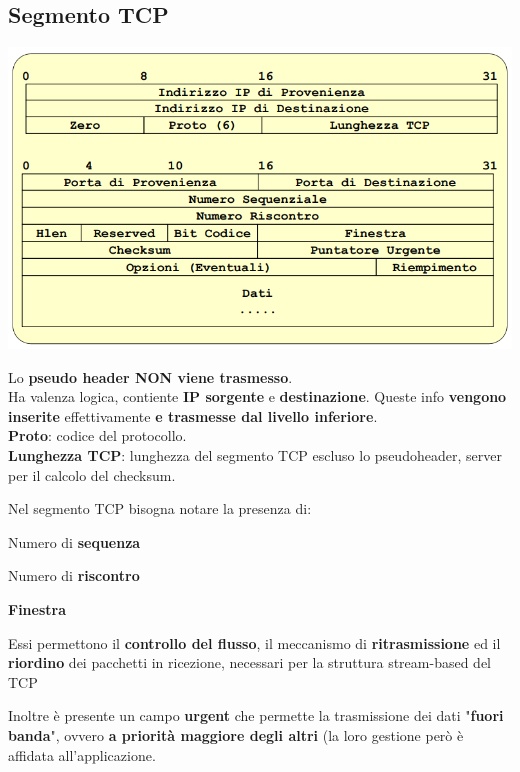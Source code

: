 \documentclass[10pt]{article}
\begin{document}
\subsection{Segmento TCP}
\begin{center}
\includegraphics[scale=0.5]{tcpsegment.png}
\end{center}
\begin{list}{}{}
\item Lo \textbf{pseudo header NON viene trasmesso}.\\
Ha valenza logica, contiente \textbf{IP sorgente} e \textbf{destinazione}. Queste info \textbf{vengono inserite} effettivamente \textbf{e trasmesse dal livello inferiore}.\\
\textbf{Proto}: codice del protocollo.\\
\textbf{Lunghezza TCP}: lunghezza del segmento TCP escluso lo pseudoheader, server per il calcolo del checksum.
\item Nel segmento TCP bisogna notare la presenza di:
	\begin{list}{}{}
	\item Numero di \textbf{sequenza}
	\item Numero di \textbf{riscontro}
	\item \textbf{Finestra}
	\end{list}
Essi permettono il \textbf{controllo del flusso}, il meccanismo di \textbf{ritrasmissione} ed il \textbf{riordino} dei pacchetti in ricezione, necessari per la struttura stream-based del TCP
\item Inoltre è presente un campo \textbf{urgent} che permette la trasmissione dei dati "\textbf{fuori banda}", ovvero \textbf{a priorità maggiore degli altri} (la loro gestione però è affidata all'applicazione.
\end{list}
\pagebreak
\end{document}
